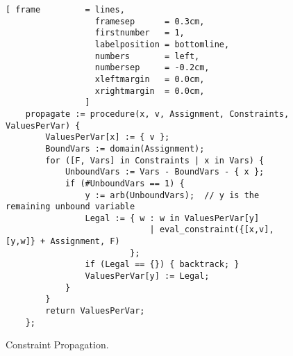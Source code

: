 \begin{figure}[!ht]
\centering
\begin{Verbatim}[ frame         = lines, 
                  framesep      = 0.3cm, 
                  firstnumber   = 1,
                  labelposition = bottomline,
                  numbers       = left,
                  numbersep     = -0.2cm,
                  xleftmargin   = 0.0cm,
                  xrightmargin  = 0.0cm,
                ]
    propagate := procedure(x, v, Assignment, Constraints, ValuesPerVar) {
        ValuesPerVar[x] := { v };
        BoundVars := domain(Assignment);
        for ([F, Vars] in Constraints | x in Vars) {
            UnboundVars := Vars - BoundVars - { x };
            if (#UnboundVars == 1) {
                y := arb(UnboundVars);  // y is the remaining unbound variable
                Legal := { w : w in ValuesPerVar[y]
                             | eval_constraint({[x,v], [y,w]} + Assignment, F)
                         };
                if (Legal == {}) { backtrack; }
                ValuesPerVar[y] := Legal;
            }
        }
        return ValuesPerVar;
    };
\end{Verbatim}
\vspace*{-0.3cm}
\caption{Constraint Propagation.}
\label{fig:csp-constraint-propagation.stlx-3}
\end{figure}

